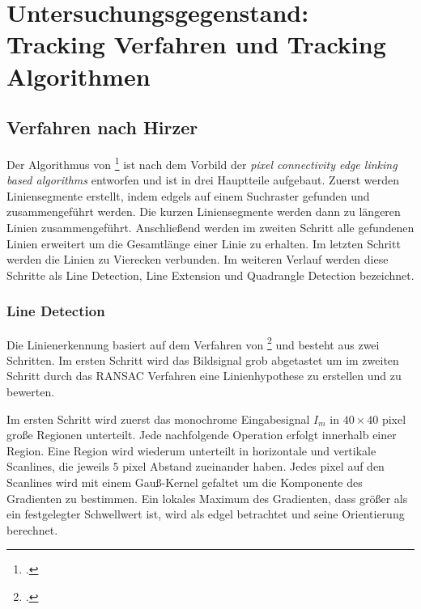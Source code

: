 \section{Untersuchungsgegenstand: Tracking Verfahren und Tracking Algorithmen} %
\label{sec:untersuchungsgegenstand}
\begin{comment}
	Untersuchungsgegenstand: Verfahren und Algorithmen präzise vorstellen und ihre Unterschiede hervorheben.
	Notwendige Kriterien der Algorithmen bestimmen

	Grober Ablauf der Verfahren:
	* Wer hats erfunden?
	* Wie ist das Verfahren aufgebaut (Algo in grob)
	* Welche Kriterien müssen erfüllt sein (monochrom, rgb eingabe)?
\end{comment}

\subsection{Verfahren nach Hirzer} %
\label{sub:verfahren_nach_hirzer}

Der Algorithmus von \citeauthor{hirzer08}\footcite{hirzer08} ist nach dem Vorbild der \textit{pixel connectivity edge
 linking based algorithms} entworfen und ist in drei Hauptteile aufgebaut. Zuerst werden Liniensegmente erstellt,
 indem \glspl{edgel} auf einem Suchraster gefunden und zusammengeführt werden. Die kurzen Liniensegmente werden dann zu
 längeren Linien zusammengeführt. Anschließend werden im zweiten Schritt alle gefundenen Linien erweitert um die
 Gesamtlänge einer Linie zu erhalten. Im letzten Schritt werden die Linien zu Vierecken verbunden. Im weiteren Verlauf
 werden diese Schritte als Line Detection, Line Extension und Quadrangle Detection bezeichnet.

\subsubsection{Line Detection} %
\label{sub:line_detection}
Die Linienerkennung basiert auf dem Verfahren von \citeauthor{clarke96}\footcite{clarke96} und besteht aus zwei
 Schritten. Im ersten Schritt wird das Bildsignal grob abgetastet um im zweiten Schritt durch das RANSAC Verfahren eine
 Linienhypothese zu erstellen und zu bewerten.

Im ersten Schritt wird zuerst das monochrome Eingabesignal $I_m$ in $40 \times 40$ \gls{pixel} große Regionen
 unterteilt. Jede nachfolgende Operation erfolgt innerhalb einer Region. Eine Region wird wiederum unterteilt in
 horizontale und vertikale Scanlines, die jeweils $5$ \gls{pixel} Abstand zueinander haben. Jedes \gls{pixel} auf den
 Scanlines wird mit einem Gauß-Kernel gefaltet um die Komponente des Gradienten zu bestimmen. Ein lokales Maximum des
 Gradienten, dass größer als ein festgelegter Schwellwert ist, wird als \gls{edgel} betrachtet und seine Orientierung
 berechnet.


